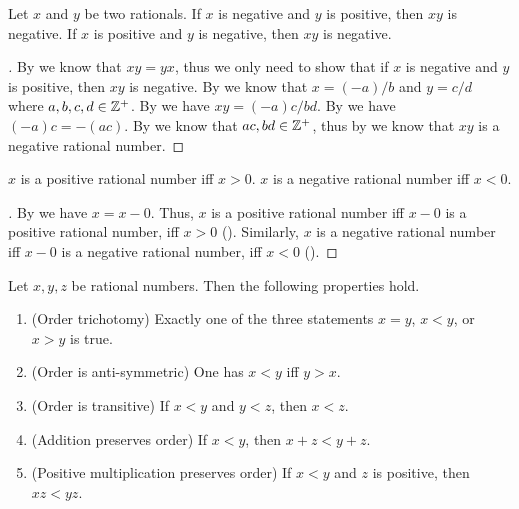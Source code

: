 \begin{ac}\label{i:ac:4.2.8}
  Let \(x\) and \(y\) be two rationals.
  If \(x\) is negative and \(y\) is positive, then \(xy\) is negative.
  If \(x\) is positive and \(y\) is negative, then \(xy\) is negative.
\end{ac}

\begin{proof}[]
  By  we know that \(xy = yx\), thus we only need to show that if \(x\) is negative and \(y\) is positive, then \(xy\) is negative.
  By  we know that \(x = (-a) / b\) and \(y = c / d\) where \(a, b, c, d \in \mathbb{Z}^+\).
  By  we have \(xy = (-a)c / bd\).
  By  we have \((-a)c = -(ac)\).
  By  we know that \(ac, bd \in \mathbb{Z}^+\), thus by  we know that \(xy\) is a negative rational number.
\end{proof}

\begin{ac}\label{i:ac:4.2.9}
  \(x\) is a positive rational number iff \(x > 0\).
  \(x\) is a negative rational number iff \(x < 0\).
\end{ac}

\begin{proof}[]
  By  we have \(x = x - 0\).
  Thus, \(x\) is a positive rational number iff \(x - 0\) is a positive rational number, iff \(x > 0\) ().
  Similarly, \(x\) is a negative rational number iff \(x - 0\) is a negative rational number, iff \(x < 0\) ().
\end{proof}

\begin{prop}\label{i:4.2.9}
  Let \(x, y, z\) be rational numbers.
  Then the following properties hold.
  \begin{enumerate}
    \item\label{i:4.2.9.a} (Order trichotomy)
    Exactly one of the three statements \(x = y\), \(x < y\), or \(x > y\) is true.
    \item\label{i:4.2.9.b} (Order is anti-symmetric)
    One has \(x < y\) iff \(y > x\).
    \item\label{i:4.2.9.c} (Order is transitive)
    If \(x < y\) and \(y < z\), then \(x < z\).
    \item\label{i:4.2.9.d} (Addition preserves order)
    If \(x < y\), then \(x + z < y + z\).
    \item\label{i:4.2.9.e} (Positive multiplication preserves order)
    If \(x < y\) and \(z\) is positive, then \(xz < yz\).
  \end{enumerate}
\end{prop}

